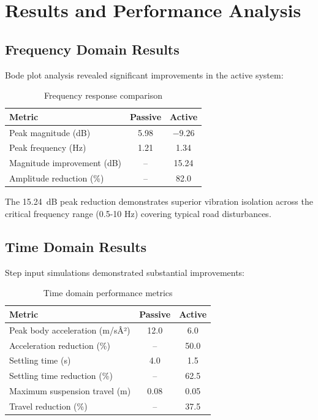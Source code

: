 \documentclass[12pt,a4paper]{article}
\begin{document}
\section{Results and Performance Analysis}

\subsection{Frequency Domain Results}
Bode plot analysis revealed significant improvements in the active system:

\begin{table}[H]
\centering
\caption{Frequency response comparison}
\begin{tabular}{@{}lcc@{}}
\toprule
\textbf{Metric} & \textbf{Passive} & \textbf{Active} \\ \midrule
Peak magnitude (dB) & 5.98 & $-9.26$ \\
Peak frequency (Hz) & 1.21 & 1.34 \\
Magnitude improvement (dB) & -- & 15.24 \\
Amplitude reduction (\%) & -- & 82.0 \\ \bottomrule
\end{tabular}
\end{table}

The \SI{15.24}{dB} peak reduction demonstrates superior vibration isolation across the critical frequency range (0.5-10 Hz) covering typical road disturbances.

\subsection{Time Domain Results}
Step input simulations demonstrated substantial improvements:

\begin{table}[H]
\centering
\caption{Time domain performance metrics}
\begin{tabular}{@{}lcc@{}}
\toprule
\textbf{Metric} & \textbf{Passive} & \textbf{Active} \\ \midrule
Peak body acceleration (m/sÂ²) & 12.0 & 6.0 \\
Acceleration reduction (\%) & -- & 50.0 \\
Settling time (s) & 4.0 & 1.5 \\
Settling time reduction (\%) & -- & 62.5 \\
Maximum suspension travel (m) & 0.08 & 0.05 \\
Travel reduction (\%) & -- & 37.5 \\ \bottomrule
\end{tabular}
\end{table}
\end{document}
